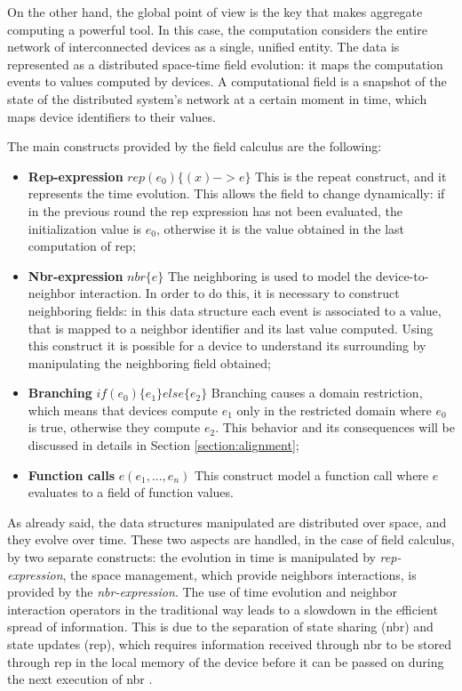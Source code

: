 On the other hand, the global point of view is the key that makes aggregate computing a powerful tool. In this case, the computation considers the entire network of interconnected devices as a single, unified entity.
The data is represented as a distributed space-time field evolution: it maps the computation events to values computed by devices.\newline
A computational field is a snapshot of the state of the distributed system's network at a certain moment in time, which maps device identifiers to their values.

The main constructs provided by the field calculus are the following:
\begin{itemize}
    \item \textbf{Rep-expression} $rep(e_0)\{(x)-> e\}$ \newline
    This is the repeat construct, and it represents the time evolution. This allows the field to change dynamically: if in the previous round the rep expression has not been evaluated, the initialization value is $e_0$, otherwise it is the value obtained in the last computation of rep;
    \item \textbf{Nbr-expression} $nbr\{e\}$\newline
    The neighboring is used to model the device-to-neighbor interaction. In order to do this, it is necessary to construct neighboring fields: in this data structure each event is associated to a value, that is mapped to a neighbor identifier and its last value computed. Using this construct it is possible for a device to understand its surrounding by manipulating the neighboring field obtained;
    \item \textbf{Branching} $if(e_0)\{e_1\} else \{e_2\}$\newline
    Branching causes a domain restriction, which means that devices compute $e_1$ only in the restricted domain where $e_0$ is true, otherwise they compute $e_2$. This behavior and its consequences will be discussed in details in Section \ref{section:alignment};
    \item \textbf{Function calls} $e(e_1, ..., e_n)$ \newline
    This construct model a function call where $e$ evaluates to a field of function values. 
\end{itemize}

As already said, the data structures manipulated are distributed over space, and they evolve over time. These two aspects are handled, in the case of field calculus, by two separate constructs: the evolution in time is manipulated by \textit{rep-expression}, the space management, which provide neighbors interactions, is provided by the \textit{nbr-expression}.\newline
The use of time evolution and neighbor interaction operators in the traditional way leads to a slowdown in the efficient spread of information. This is due to the separation of state sharing (nbr) and state updates (rep), which requires information received through nbr to be stored through rep in the local memory of the device before it can be passed on during the next execution of nbr \cite{share_operator}. 

